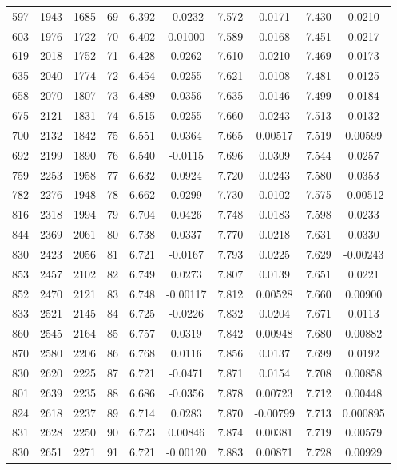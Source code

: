 \documentclass[]{article}
\begin{document}
\begin{tabular}{lccccccccc}
597 & 1943 & 1685 & 69 & 6.392 & -0.0232 & 7.572 & 0.0171 & 7.430 & 0.0210 \\
603 & 1976 & 1722 & 70 & 6.402 & 0.01000 & 7.589 & 0.0168 & 7.451 & 0.0217 \\
619 & 2018 & 1752 & 71 & 6.428 & 0.0262 & 7.610 & 0.0210 & 7.469 & 0.0173 \\
635 & 2040 & 1774 & 72 & 6.454 & 0.0255 & 7.621 & 0.0108 & 7.481 & 0.0125 \\
658 & 2070 & 1807 & 73 & 6.489 & 0.0356 & 7.635 & 0.0146 & 7.499 & 0.0184 \\
675 & 2121 & 1831 & 74 & 6.515 & 0.0255 & 7.660 & 0.0243 & 7.513 & 0.0132 \\
700 & 2132 & 1842 & 75 & 6.551 & 0.0364 & 7.665 & 0.00517 & 7.519 & 0.00599 \\
692 & 2199 & 1890 & 76 & 6.540 & -0.0115 & 7.696 & 0.0309 & 7.544 & 0.0257 \\
759 & 2253 & 1958 & 77 & 6.632 & 0.0924 & 7.720 & 0.0243 & 7.580 & 0.0353 \\
782 & 2276 & 1948 & 78 & 6.662 & 0.0299 & 7.730 & 0.0102 & 7.575 & -0.00512 \\
816 & 2318 & 1994 & 79 & 6.704 & 0.0426 & 7.748 & 0.0183 & 7.598 & 0.0233 \\
844 & 2369 & 2061 & 80 & 6.738 & 0.0337 & 7.770 & 0.0218 & 7.631 & 0.0330 \\
830 & 2423 & 2056 & 81 & 6.721 & -0.0167 & 7.793 & 0.0225 & 7.629 & -0.00243 \\
853 & 2457 & 2102 & 82 & 6.749 & 0.0273 & 7.807 & 0.0139 & 7.651 & 0.0221 \\
852 & 2470 & 2121 & 83 & 6.748 & -0.00117 & 7.812 & 0.00528 & 7.660 & 0.00900 \\
833 & 2521 & 2145 & 84 & 6.725 & -0.0226 & 7.832 & 0.0204 & 7.671 & 0.0113 \\
860 & 2545 & 2164 & 85 & 6.757 & 0.0319 & 7.842 & 0.00948 & 7.680 & 0.00882 \\
870 & 2580 & 2206 & 86 & 6.768 & 0.0116 & 7.856 & 0.0137 & 7.699 & 0.0192 \\
830 & 2620 & 2225 & 87 & 6.721 & -0.0471 & 7.871 & 0.0154 & 7.708 & 0.00858 \\
801 & 2639 & 2235 & 88 & 6.686 & -0.0356 & 7.878 & 0.00723 & 7.712 & 0.00448 \\
824 & 2618 & 2237 & 89 & 6.714 & 0.0283 & 7.870 & -0.00799 & 7.713 & 0.000895 \\
831 & 2628 & 2250 & 90 & 6.723 & 0.00846 & 7.874 & 0.00381 & 7.719 & 0.00579 \\
 830 & 2651 & 2271 & 91 & 6.721 & -0.00120 & 7.883 & 0.00871 & 7.728 & 0.00929 \\ \hline
\end{tabular}
\end{document}
